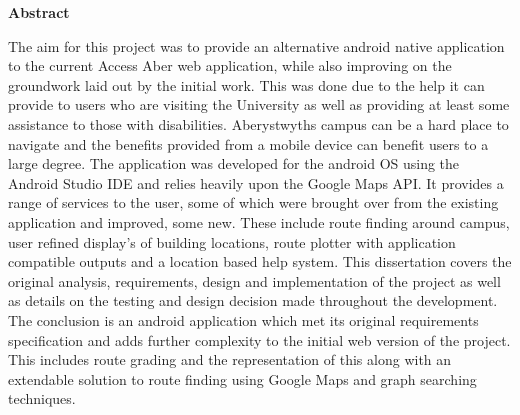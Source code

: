 \thispagestyle{empty}

\begin{center}
    {\LARGE\bf Abstract}
\end{center}

The aim for this project was to provide an alternative android native application to the current
Access Aber web application, while also improving on the groundwork laid out by the initial
work. This was done due to the help it can provide to users who are visiting the University as
well as providing at least some assistance to those with disabilities. Aberystwyths campus can be
a hard place to navigate and the benefits provided from a mobile device can benefit users to a large
degree.
The application was developed for the android OS using the Android Studio IDE and relies
heavily upon the Google Maps API. It provides a range of services to the user, some of which
were brought over from the existing application and improved, some new. These include route
finding around campus, user refined display’s of building locations, route plotter with application
compatible outputs and a location based help system.
This dissertation covers the original analysis, requirements, design and implementation of the
project as well as details on the testing and design decision made throughout the development.
The conclusion is an android application which met its original requirements specification and
adds further complexity to the initial web version of the project. This includes route grading and
the representation of this along with an extendable solution to route finding using Google Maps
and graph searching techniques.